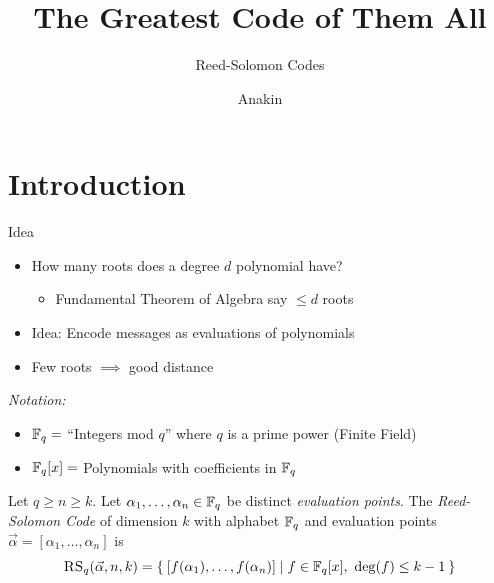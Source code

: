 \documentclass[aspectratio=169]{beamer}
\title{The Greatest Code of Them All}
\subtitle{Reed-Solomon Codes}
\author{Anakin}
\date{}
\begin{document}

\begin{frame}
\titlepage
\end{frame}

\section{Introduction}
\frame{\sectionpage}

\begin{frame}{Idea}
    \begin{itemize}
        \item \textcolor{sigma@alertred}{How many roots does a degree $d$ polynomial have?}\pause 
        \begin{itemize}
            \item Fundamental Theorem of Algebra say \textcolor{sigma@mainblue}{$\leq d$ roots}
        \end{itemize} \pause
        \item \textcolor{sigma@mainblue}{Idea:} Encode messages as evaluations of polynomials
        \item Few roots $\implies$ good distance
    \end{itemize}
\end{frame}

\begin{frame}{}
    \emph{Notation:}
    \begin{itemize}
        \item $\mathbb{F}_q = $ ``Integers mod $q$'' where $q$ is a prime power (Finite Field)
        \item $\mathbb{F}_q[x] = $ Polynomials with coefficients in $\mathbb{F}_q$
    \end{itemize}\pause
    \vspace{10pt}
    \begin{defn}
        Let $q \geq n \geq k$.
        Let $\alpha_1, \ldots, \alpha_n \in \mathbb{F}_q$ be distinct \emph{evaluation points}.
        The \emph{Reed-Solomon Code} of dimension $k$ with alphabet $\mathbb{F}_q$ and evaluation points $\vec{\alpha} = [\alpha_1, \ldots, \alpha_n]$ is
        \[
            \textsc{RS}_q(\vec{\alpha}, n, k) = \Set{ \bqty{f(\alpha_1), \ldots, f(\alpha_n)} | f \in \F_q[x],~ \deg(f) \leq k - 1}
        \]
    \end{defn}
\end{frame}
\end{document}
